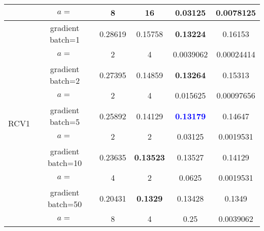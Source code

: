 \documentclass[12pt]{article}
\begin{document}
\begin{tabular}{|c|c|cc|cc|}
& $a=$ & 8 & 16 & 0.03125 & 0.0078125\\
\hline
\multirow{10}{*}{RCV1}& gradient batch=1 & 0.28619 & 0.15758 & \textbf{0.13224} & 0.16153\\
& $a=$ & 2 & 4 & 0.0039062 & 0.00024414\\
& gradient batch=2 & 0.27395 & 0.14859 & \textbf{0.13264} & 0.15313\\
& $a=$ & 2 & 4 & 0.015625 & 0.00097656\\
& gradient batch=5 & 0.25892 & 0.14129 & \textcolor{blue}{\textbf{0.13179}} & 0.14647\\
& $a=$ & 2 & 2 & 0.03125 & 0.0019531\\
& gradient batch=10 & 0.23635 & \textbf{0.13523} & 0.13527 & 0.14129\\
& $a=$ & 4 & 2 & 0.0625 & 0.0019531\\
& gradient batch=50 & 0.20431 & \textbf{0.1329} & 0.13428 & 0.1349\\
& $a=$ & 8 & 4 & 0.25 & 0.0039062\\
\hline
\end{tabular}
\end{document}

